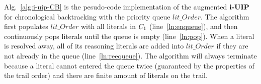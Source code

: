 Alg.~\ref{alg:i-uip-CB} is the pesudo-code implementation of the augmented $\textbf{i-UIP}$ for chronological backtracking with the priority queue $lit\_Order$. The algorithm first populates $lit\_Order$ with all literals in $C_{1}$ (line~\ref{ln:enqueue}), and then continuously pops literals until the queue is empty (line~\ref{ln:pop}). When a literal is resolved away, all of its reasoning literals are added into $lit\_Order$ if they are not already in the queue (line~\ref{ln:reequeue}). The algorithm will always terminate because a literal cannot entered the queue twice (guaranteed by the properties of the trail order) and there are finite amount of literals on the trail.

